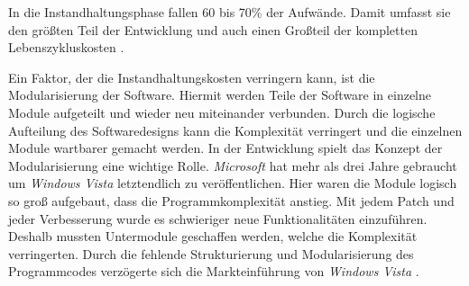 
In die Instandhaltungsphase fallen 60 bis 70\% der Aufwände. Damit umfasst sie den größten Teil der Entwicklung und auch einen Großteil der kompletten Lebenszykluskosten \citep[vgl.][3]{Ogheneovo2014}.


Ein Faktor, der die Instandhaltungskosten verringern kann, ist die Modularisierung der Software. Hiermit werden Teile der Software in einzelne Module aufgeteilt und wieder neu miteinander verbunden. Durch die logische Aufteilung des Softwaredesigns kann die Komplexität verringert und die einzelnen Module wartbarer gemacht werden. In der Entwicklung spielt das Konzept der Modularisierung eine wichtige Rolle. \textit{Microsoft} hat mehr als drei Jahre gebraucht um \textit{Windows Vista} letztendlich zu veröffentlichen. Hier waren die Module logisch so groß aufgebaut, dass die Programmkomplexität anstieg. Mit jedem Patch und jeder Verbesserung wurde es schwieriger neue Funktionalitäten einzuführen. Deshalb mussten Untermodule geschaffen werden, welche die Komplexität verringerten. Durch die fehlende Strukturierung und Modularisierung des Programmcodes verzögerte sich die Markteinführung von \textit{Windows Vista} \citep[vgl.][8\psq]{Ogheneovo2014}.

